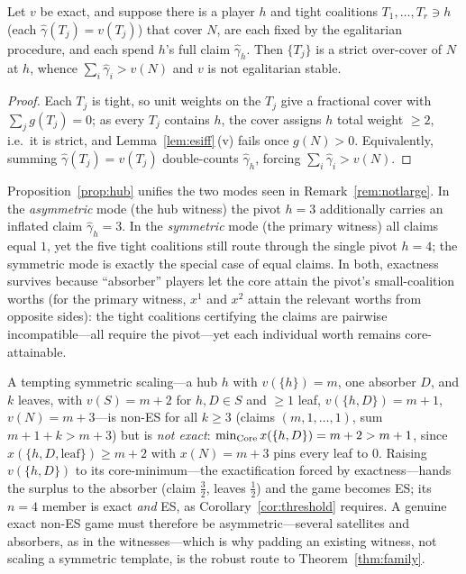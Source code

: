 \begin{proposition}\label{prop:hub}
Let $v$ be exact, and suppose there is a player $h$ and tight coalitions
$T_1,\dots,T_r\ni h$ (each $\widehat\gamma(T_j)=v(T_j)$) that cover $N$, are
each fixed by the egalitarian procedure, and each spend $h$'s full claim
$\widehat\gamma_h$. Then $\{T_j\}$ is a strict over-cover of $N$ at $h$, whence
$\sum_i\widehat\gamma_i>v(N)$ and $v$ is not egalitarian stable.
\end{proposition}

\begin{proof}
Each $T_j$ is tight, so unit weights on the $T_j$ give a fractional cover with
$\sum_j g(T_j)=0$; as every $T_j$ contains $h$, the cover assigns $h$ total
weight $\ge2$, i.e.\ it is strict, and Lemma~\ref{lem:esiff}\,(v) fails once
$g(N)>0$. Equivalently, summing $\widehat\gamma(T_j)=v(T_j)$ double-counts
$\widehat\gamma_h$, forcing $\sum_i\widehat\gamma_i>v(N)$.
\end{proof}

Proposition~\ref{prop:hub} unifies the two modes seen in
Remark~\ref{rem:notlarge}. In the \emph{asymmetric} mode (the hub witness) the
pivot $h=3$ additionally carries an inflated claim $\widehat\gamma_h=3$. In the
\emph{symmetric} mode (the primary witness) all claims equal $1$, yet the five
tight coalitions still route through the single pivot $h=4$; the symmetric mode
is exactly the special case of equal claims. In both, exactness survives because
``absorber'' players let the core attain the pivot's small-coalition worths (for
the primary witness, $x^{1}$ and $x^{2}$ attain the relevant worths from opposite
sides): the tight coalitions certifying the claims are pairwise
incompatible---all require the pivot---yet each individual worth remains
core-attainable.

\begin{remark}\label{rem:obstruction}
A tempting symmetric scaling---a hub $h$ with $v(\{h\})=m$, one absorber $D$, and
$k$ leaves, with $v(S)=m+2$ for $h,D\in S$ and $\ge1$ leaf, $v(\{h,D\})=m+1$,
$v(N)=m+3$---is non-ES for all $k\ge3$ (claims $(m,1,\dots,1)$, sum $m+1+k>m+3$)
but is \emph{not exact}: $\min_{\operatorname{Core}}x(\{h,D\})=m+2>m+1$, since
$x(\{h,D,\text{leaf}\})\ge m+2$ with $x(N)=m+3$ pins every leaf to $0$. Raising
$v(\{h,D\})$ to its core-minimum---the exactification forced by exactness---hands
the surplus to the absorber (claim $\tfrac32$, leaves $\tfrac12$) and the game
becomes ES; its $n=4$ member is exact \emph{and} ES, as
Corollary~\ref{cor:threshold} requires. A genuine exact non-ES game must
therefore be asymmetric---several satellites and absorbers, as in the
witnesses---which is why padding an existing witness, not scaling a symmetric
template, is the robust route to Theorem~\ref{thm:family}.
\end{remark}

